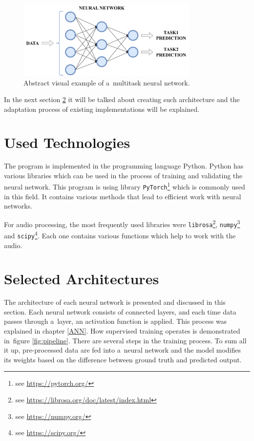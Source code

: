     \begin{figure}[ht!]
        \centering
        \includegraphics[width = 0.8\textwidth]{obrazky-figures/MTL.pdf}
        \caption{Abstract visual example of a~multitask neural network.}
        \label{fig:MTL}
    \end{figure}
    
    In the next section \ref{Architectures} it will be talked about creating such architecture and the adaptation process of existing implementations will be explained. 
        
\section{Used Technologies}

    The program is implemented in the programming language Python. Python has various libraries which can be used in the process of training and validating the neural network. This program is using library \texttt{PyTorch}\footnote{see \href{https://pytorch.org/}{{\selectfont https://pytorch.org/}}} which is commonly used in this field. It contains various methods that lead to efficient work with neural networks.

    For audio processing, the most frequently used libraries were \texttt{librosa}\footnote{see \href{https://librosa.org/doc/latest/index.html}{{\selectfont https://librosa.org/doc/latest/index.html}}}, \texttt{numpy}\footnote{see \href{https://numpy.org/}{{\selectfont https://numpy.org/}}} and \texttt{scipy}\footnote{see \href{https://scipy.org/}{{\selectfont https://scipy.org/}}}. Each one contains various functions which help to work with the audio. 
    

\section{Selected Architectures}\label{Architectures}

    The architecture of each neural network is presented and discussed in this section. 
    Each neural network consists of connected layers, and each time data passes through a~layer, an activation function is applied. This process was explained in chapter \ref{ANN}.
    How supervised training operates is demonstrated in figure \ref{fig:pipeline}. There are several steps in the training process. 
    To sum all it up, pre-processed data are fed into a~neural network and the model modifies its weights based on the difference between ground truth and predicted output. 



